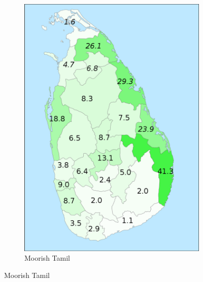 \documentclass{article}
\begin{document}
\begin{figure}
\begin{center}
\begin{subfigure}[b]{.4\textwidth}{ 
\includegraphics[width=\textwidth]{SriLankaMoor.png}
\caption{Moorish Tamil}
}
\end{subfigure}

\end{center}
\end{figure}
\end{document}
